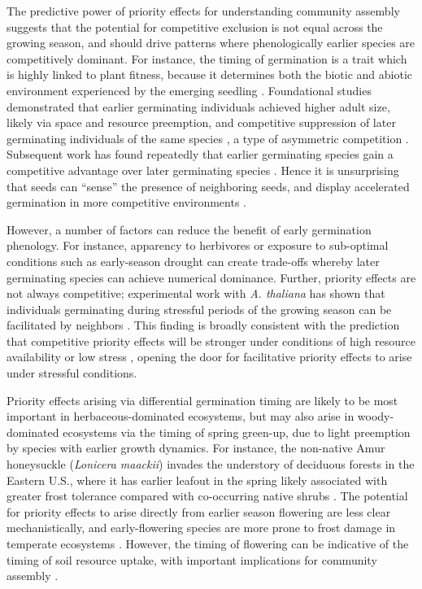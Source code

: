 \documentclass[11pt]{article}
\begin{document}
The predictive power of priority effects for understanding community assembly suggests that the potential for competitive exclusion is not equal across the growing season, and should drive patterns where phenologically earlier species are competitively dominant. For instance, the timing of germination is a trait which is highly linked to plant fitness, because it determines both the biotic and abiotic environment experienced by the emerging seedling \citep{donohue2010germination}. Foundational studies demonstrated that earlier germinating individuals achieved higher adult size, likely via space and resource preemption, and competitive suppression of later germinating individuals of the same species \citep{ross1972occupation},  a type of asymmetric competition \citep{connolly1996asymmetric}. Subsequent work has found repeatedly that earlier germinating species gain a competitive advantage over later germinating species \citep{cleland2015priority,waterton2016trade,blackford2020species}. Hence it is unsurprising that seeds can “sense” the presence of neighboring seeds, and display accelerated germination in more competitive environments \citep{dyer2000accelerated}.

However, a number of factors can reduce the benefit of early germination phenology. For instance, apparency to herbivores \citep{waterton2016trade} or exposure to sub-optimal conditions such as early-season drought \citep{wainwright2012seasonal} can create trade-offs whereby later germinating species can achieve numerical dominance. Further, priority effects are not always competitive; experimental work with \textit{A. thaliana} has shown that individuals germinating during stressful periods of the growing season can be facilitated by neighbors \citep{leverett2017germination}. This finding is broadly consistent with the prediction that competitive priority effects will be stronger under conditions of high resource availability or low stress \citep{vannette2014historical}, opening the door for facilitative priority effects to arise under stressful conditions.

Priority effects arising via differential germination timing are likely to be most important in herbaceous-dominated ecosystems, but may also arise in woody-dominated ecosystems via the timing of spring green-up, due to light preemption by species with earlier growth dynamics. For instance, the non-native Amur honeysuckle (\textit{Lonicera maackii}) invades the understory of deciduous forests in the Eastern U.S., where it has earlier leafout in the spring likely associated with greater frost tolerance compared with co-occurring native shrubs \citep{mcewan2009leaf}. The potential for priority effects to arise directly from earlier season flowering are less clear mechanistically, and early-flowering species are more prone to frost damage in temperate ecosystems \citep{inouye2008effects}. However, the timing of flowering can be indicative of the timing of soil resource uptake, with important implications for community assembly \citep{gulmon1983phenology,seabloom2003invasion}.
\end{document}
